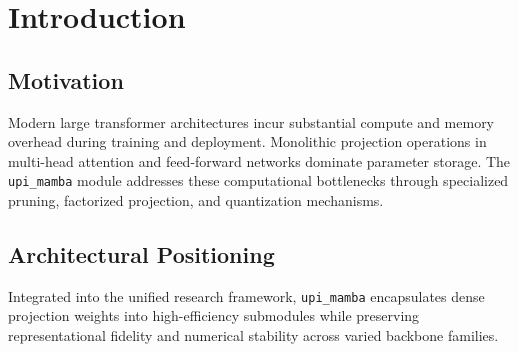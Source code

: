 \section{Introduction}

\subsection{Motivation}
Modern large transformer architectures incur substantial compute and memory overhead during training and deployment. Monolithic projection operations in multi-head attention and feed-forward networks dominate parameter storage. The \texttt{upi_mamba} module addresses these computational bottlenecks through specialized pruning, factorized projection, and quantization mechanisms.

\subsection{Architectural Positioning}
Integrated into the unified research framework, \texttt{upi_mamba} encapsulates dense projection weights into high-efficiency submodules while preserving representational fidelity and numerical stability across varied backbone families.
